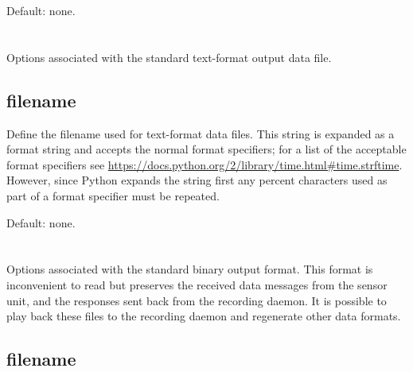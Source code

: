 Default: none.


\section{\code{[awnettextdata]}}

Options associated with the standard text-format output data file.

\subsection{filename}
\label{sec:config-data-filename}
Define the filename used for text-format data files. This string is
expanded as a  format string and accepts the normal
 format specifiers; for a list of the acceptable format
specifiers see
\url{https://docs.python.org/2/library/time.html#time.strftime}. However,
since Python expands the string first any percent characters used as
part of a  format specifier must be repeated.

Default: none.


\section{\code{[awpacket]}}
Options associated with the standard binary output format. This format is
inconvenient to read but preserves the received data messages from the sensor
unit, and the responses sent back from the recording daemon. It is possible to
play back these files to the recording daemon and regenerate other data formats.

\subsection{filename}

